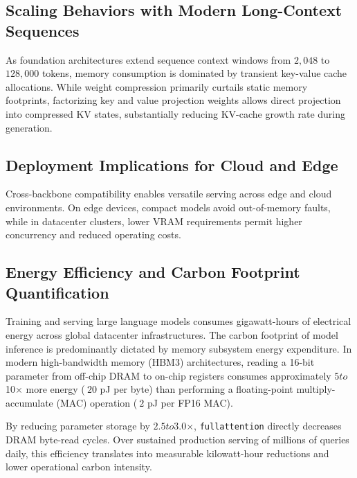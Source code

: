 \subsection{Scaling Behaviors with Modern Long-Context Sequences}
As foundation architectures extend sequence context windows from $2{,}048$ to $128{,}000$ tokens, memory consumption is dominated by transient key-value cache allocations. While weight compression primarily curtails static memory footprints, factorizing key and value projection weights allows direct projection into compressed KV states, substantially reducing KV-cache growth rate during generation.

\subsection{Deployment Implications for Cloud and Edge}
Cross-backbone compatibility enables versatile serving across edge and cloud environments. On edge devices, compact models avoid out-of-memory faults, while in datacenter clusters, lower VRAM requirements permit higher concurrency and reduced operating costs.

\subsection{Energy Efficiency and Carbon Footprint Quantification}
Training and serving large language models consumes gigawatt-hours of electrical energy across global datacenter infrastructures. The carbon footprint of model inference is predominantly dictated by memory subsystem energy expenditure. In modern high-bandwidth memory (HBM3) architectures, reading a 16-bit parameter from off-chip DRAM to on-chip registers consumes approximately $5$\times$ to $10$\times$ more energy ($~20$ pJ per byte) than performing a floating-point multiply-accumulate (MAC) operation ($~2$ pJ per FP16 MAC).

By reducing parameter storage by $2.5$\times$ to $3.0$\times$, \texttt{fullattention} directly decreases DRAM byte-read cycles. Over sustained production serving of millions of queries daily, this efficiency translates into measurable kilowatt-hour reductions and lower operational carbon intensity.
